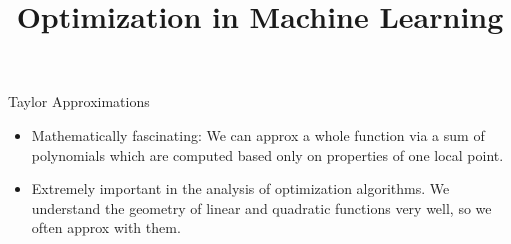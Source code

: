 \documentclass[11pt,compress,t,notes=noshow, xcolor=table]{beamer}
\title{Optimization in Machine Learning}
\date{}
\begin{document}
\sloppy


\begin{vbframe}{Taylor Approximations}

\begin{itemize}

\item Mathematically fascinating:
We can approx a whole function via a sum of polynomials which are computed based only on properties of one local point. 

\item Extremely important in the analysis of optimization algorithms. We understand the geometry of linear and quadratic functions very well, so we often approx with them.
\end{itemize}


\end{vbframe}
\end{document}
